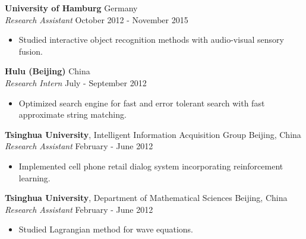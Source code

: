 \documentclass[a4paper,11pt]{article} %
\begin{document}

\textbf{University of Hamburg} \hfill Germany \\
\textit{Research Assistant}  \hfill October 2012 - November 2015
\vspace{-.9\parskip}
\begin{itemize}
  \item Studied interactive object recognition methods with audio-visual sensory fusion.
\end{itemize}


\textbf{Hulu (Beijing)} \hfill China \\
\textit{Research Intern} \hfill July - September 2012
\vspace{-.9\parskip}
\begin{itemize}
  \item Optimized search engine for fast and error tolerant search with fast approximate string matching.
\end{itemize}


\iffalse

\textbf{Tsinghua University}, Intelligent Information Acquisition Group \hfill Beijing, China \\
\textit{Research Assistant} \hfill February - June 2012
\vspace{-\parskip}
\begin{itemize}
  \item Implemented cell phone retail dialog system incorporating reinforcement learning.
\end{itemize}


\textbf{Tsinghua University}, Department of Mathematical Sciences \hfill Beijing, China \\
\textit{Research Assistant} \hfill February - June 2012
\vspace{-\parskip}
\begin{itemize}
  \item Studied Lagrangian method for wave equations.
\end{itemize}

\end{document}
